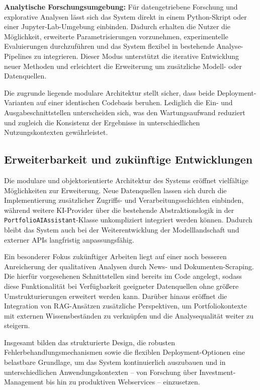      \textbf{Analytische Forschungsumgebung:}
      Für datengetriebene Forschung und explorative Analysen lässt sich das System direkt in einem Python-Skript oder einer Jupyter-Lab-Umgebung einbinden.
      Dadurch erhalten die Nutzer die Möglichkeit, erweiterte Parametrisierungen vorzunehmen, experimentelle Evaluierungen durchzuführen und das System flexibel in bestehende Analyse-Pipelines zu integrieren.
      Dieser Modus unterstützt die iterative Entwicklung neuer Methoden und erleichtert die Erweiterung um zusätzliche Modell- oder Datenquellen.

      Die zugrunde liegende modulare Architektur stellt sicher, dass beide Deployment-Varianten auf einer identischen Codebasis beruhen.
      Lediglich die Ein- und Ausgabeschnittstellen unterscheiden sich, was den Wartungsaufwand reduziert und zugleich die Konsistenz der Ergebnisse in unterschiedlichen Nutzungskontexten gewährleistet.


    \subsection{Erweiterbarkeit und zukünftige Entwicklungen}

      Die modulare und objektorientierte Architektur des Systems eröffnet vielfältige Möglichkeiten zur Erweiterung.
      Neue Datenquellen lassen sich durch die Implementierung zusätzlicher Zugriffs- und Verarbeitungsschichten einbinden, während weitere \acs{KI}-Provider über die bestehende Abstraktionslogik in der \texttt{PortfolioAIAssistant}-Klasse unkompliziert integriert werden können.
      Dadurch bleibt das System auch bei der Weiterentwicklung der Modelllandschaft und externer APIs langfristig anpassungsfähig.

      Ein besonderer Fokus zukünftiger Arbeiten liegt auf einer noch besseren Anreicherung der qualitativen Analysen durch News- und Dokumenten-Scraping.
      Die hierfür vorgesehenen Schnittstellen sind bereits im Code angelegt, sodass diese Funktionalität bei Verfügbarkeit geeigneter Datenquellen ohne größere Umstrukturierungen erweitert werden kann.
      Darüber hinaus eröffnet die Integration von \acs{RAG}-Ansätzen zusätzliche Perspektiven, um Portfoliokontexte mit externen Wissensbeständen zu verknüpfen und die Analysequalität weiter zu steigern.

      Insgesamt bilden das strukturierte Design, die robusten Fehlerbehandlungsmechanismen sowie die flexiblen Deployment-Optionen eine belastbare Grundlage, um das System kontinuierlich auszubauen und in unterschiedlichen Anwendungskontexten -- von Forschung über Investment-Management bis hin zu produktiven Webservices -- einzusetzen.



